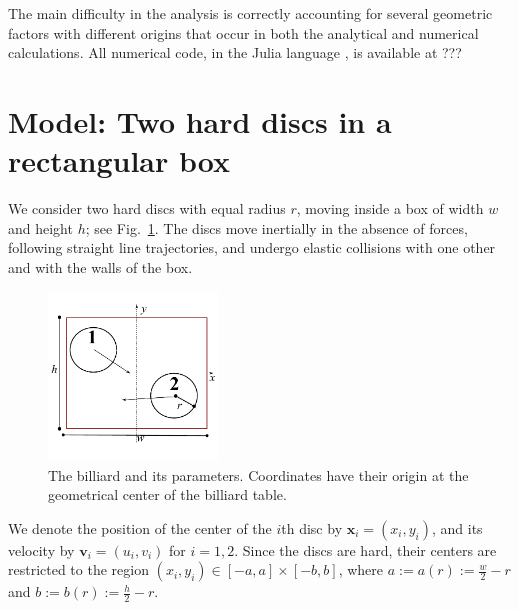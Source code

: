 \documentclass[superscriptaddress,pre,reprint,showpacs,twocolumn]{revtex4-1}
\newcommand{\defeq}{:=}
\begin{document}
The main difficulty in the analysis is correctly accounting for several geometric factors with different origins that occur in both the
analytical and numerical calculations. All numerical code, in the Julia language \cite{Julia}, is available at ???




\section{Model: Two hard discs in a rectangular box}

We consider two hard discs with equal radius $r$,
moving inside a box of width $w$ and height $h$; see Fig.~\ref{billar01}. 
The discs move inertially in the absence of forces, 
following straight line trajectories,
and undergo elastic collisions with one 
other and with the walls of the box.

\begin{figure}[h]
  \begin{center}
    \includegraphics[width=0.40\textwidth]{figures/DiscsBox01.pdf}
  \end{center}
  \caption{The billiard and its parameters. Coordinates
    have their origin at the geometrical center of the 
    billiard table.}\label{billar01}
\end{figure}


We denote the position of the center of the $i$th disc by 
$\mathbf{x}_i = (x_i, y_i)$, and its velocity by $\mathbf{v}_i = (u_i, v_i)$ for $i=1,2$. Since the discs are hard, 
their centers are restricted to the region 
$(x_i, y_i) \in [-a,a] \times [-b, b]$, where 
$a \defeq a(r) \defeq \frac{w}{2} - r $ and
$b \defeq b(r) \defeq \frac{h}{2} - r $.
\end{document}
